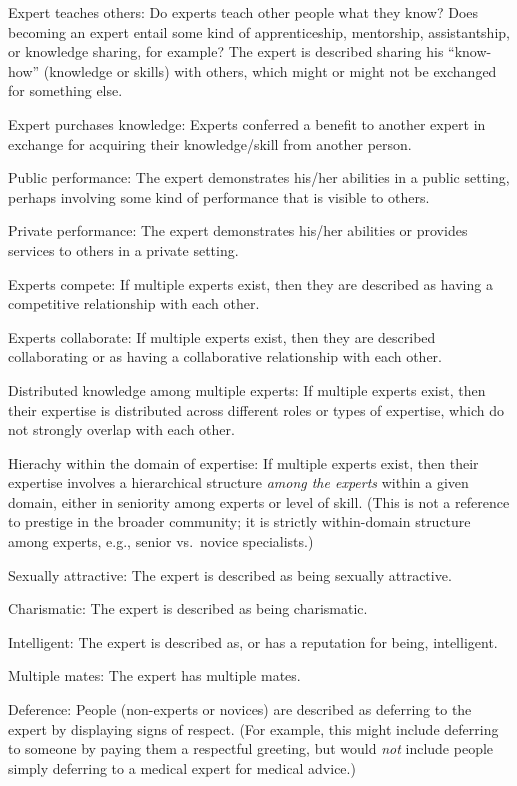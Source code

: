 \documentclass[
]{article}
\begin{document}
Expert teaches others: Do experts teach other people what they know? Does becoming an expert entail some kind of apprenticeship, mentorship, assistantship, or knowledge sharing, for example? The expert is described sharing his ``know-how'' (knowledge or skills) with others, which might or might not be exchanged for something else.

Expert purchases knowledge: Experts conferred a benefit to another expert in exchange for acquiring their knowledge/skill from another person.

Public performance: The expert demonstrates his/her abilities in a public setting, perhaps involving some kind of performance that is visible to others.

Private performance: The expert demonstrates his/her abilities or provides services to others in a private setting.

Experts compete: If multiple experts exist, then they are described as having a competitive relationship with each other.

Experts collaborate: If multiple experts exist, then they are described collaborating or as having a collaborative relationship with each other.

Distributed knowledge among multiple experts: If multiple experts exist, then their expertise is distributed across different roles or types of expertise, which do not strongly overlap with each other.

Hierachy within the domain of expertise: If multiple experts exist, then their expertise involves a hierarchical structure \emph{among the experts} within a given domain, either in seniority among experts or level of skill. (This is not a reference to prestige in the broader community; it is strictly within-domain structure among experts, e.g., senior vs.~novice specialists.)

Sexually attractive: The expert is described as being sexually attractive.

Charismatic: The expert is described as being charismatic.

Intelligent: The expert is described as, or has a reputation for being, intelligent.

Multiple mates: The expert has multiple mates.

Deference: People (non-experts or novices) are described as deferring to the expert by displaying signs of respect. (For example, this might include deferring to someone by paying them a respectful greeting, but would \emph{not} include people simply deferring to a medical expert for medical advice.)
\end{document}
